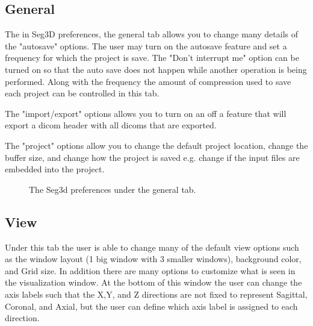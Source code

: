 \documentclass[fleqn,11pt,openany]{book}
\begin{document}
\subsection{General}
The in Seg3D preferences, the general tab allows you to change many details of the "autosave" options.  The user
may turn on the autosave feature and set a frequency for which the project is save.  The "Don't interrupt me" option 
can be turned on so that the auto save does not happen while another operation is being performed. Along with the
frequency the amount of compression used to save each project can be controlled in this tab.  

The "import/export" options allows you to turn on an off a feature that will export a dicom header with all dicoms that are
exported.

The "project" options allow you to change the default project location, change the buffer size, and change how the project
is saved e.g. change if the input files are embedded into the project.

\begin{figure}[h!]
\caption{The Seg3d preferences under the general tab.}\label{fig:Pref_gen}
\end{figure}


\subsection{View}
Under this tab the user is able to change many of the default view options such as the window layout (1 big window with 3 smaller windows), background color, and Grid size. In addition there are many options to customize what is seen in the visualization window.  At the bottom of this window the user can change the axis labels such that the X,Y, and Z directions
are not fixed to represent Sagittal, Coronal, and Axial, but the user can define which axis label is assigned to each direction.
\end{document}
